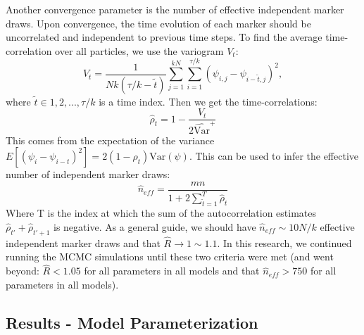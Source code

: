 \documentclass[
]{article}
\begin{document}
Another convergence parameter is the number of effective independent marker draws. Upon convergence, the time evolution of each marker should be uncorrelated and independent to previous time steps. To find the average time-correlation over all particles, we use the variogram \(V_t\):
\begin{equation}
  V_t=\frac{1}{Nk(\tau/k-\tilde{t})}\sum_{j=1}^{kN}\sum_{i=1}^{\tau/k}(\psi_{i,j}-\psi_{i-\tilde{t},j})^2,
\end{equation}
where \(\tilde{t}\in 1,2,...,\tau/k\) is a time index. Then we get the time-correlations:
\begin{equation}
  \hat{\rho}_t=1-\frac{V_t}{2\hat{\text{Var}}^+}
\end{equation}
This comes from the expectation of the variance \(E[(\psi_i-\psi_{i-t})^2]=2(1-\rho_t)\text{Var}(\psi)\). This can be used to infer the effective number of independent marker draws:
\begin{equation}
  \hat{n}_{eff}=\frac{mn}{1+2\sum_{\tilde{t}=1}^T\hat{\rho}_t}
\end{equation}
Where T is the index at which the sum of the autocorrelation estimates \(\hat{\rho}_{t'}+\hat{\rho}_{t'+1}\) is negative. As a general guide, we should have \(\hat{n}_{eff}\sim 10N/k\) effective independent marker draws and that \(\hat{R}\to 1\sim 1.1\). In this research, we continued running the MCMC simulations until these two criteria were met (and went beyond: \(\hat{R}<1.05\) for all parameters in all models and that \(\hat{n}_{eff}>750\) for all parameters in all models).

\subsection{Results - Model Parameterization}\label{results---model-parameterization}
\end{document}
